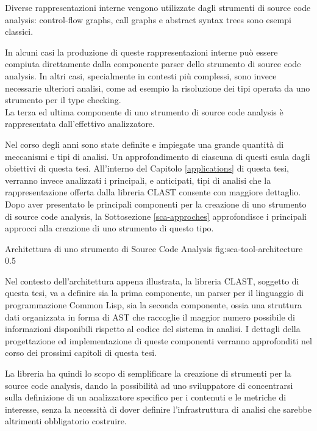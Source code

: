 Diverse  rappresentazioni interne vengono utilizzate dagli strumenti di source
code analysis: control-flow graphs, call graphs e abstract syntax trees sono
esempi classici.

In alcuni casi la produzione di queste rappresentazioni interne può essere
compiuta direttamente dalla componente parser dello strumento di source code
analysis. In altri casi, specialmente in contesti più complessi, sono invece
necessarie ulteriori analisi, come ad esempio la risoluzione dei tipi operata
da uno strumento per il type checking.\\

La terza ed ultima componente di uno strumento di source code analysis è
rappresentata dall’effettivo analizzatore.

Nel corso degli anni sono state definite e impiegate una grande quantità di
meccanismi e tipi di analisi. Un approfondimento di ciascuna di questi esula
dagli obiettivi di questa tesi. All’interno del Capitolo \ref{applications} di
questa tesi, verranno invece analizzati i principali, e anticipati, tipi di
analisi che la rappresentazione offerta dalla libreria CLAST consente con
maggiore dettaglio.\\

Dopo aver presentato le principali componenti per la creazione di uno strumento
di source code analysis, la Sottosezione \ref{sca-approches} approfondisce i
principali approcci alla creazione di uno strumento di questo tipo.

      {Architettura di uno strumento di Source Code Analysis}
      {fig:sca-tool-architecture}
      {0.5}

Nel contesto dell'architettura appena illustrata, la libreria CLAST, soggetto di
questa tesi, va a definire sia la prima componente, un parser per il linguaggio
di programmazione Common Lisp, sia la seconda componente, ossia una struttura
dati organizzata in forma di AST che raccoglie il maggior numero possibile di
informazioni disponibili rispetto al codice del sistema in analisi. I dettagli
della progettazione ed implementazione di queste componenti verranno approfonditi
nel corso dei prossimi capitoli di questa tesi.

La libreria ha quindi lo scopo di semplificare la creazione di strumenti per la
source code analysis, dando la possibilità ad uno sviluppatore di concentrarsi
sulla definizione di un analizzatore specifico per i contenuti e le metriche di
interesse, senza la necessità di dover definire l'infrastruttura di analisi che
sarebbe altrimenti obbligatorio costruire.

